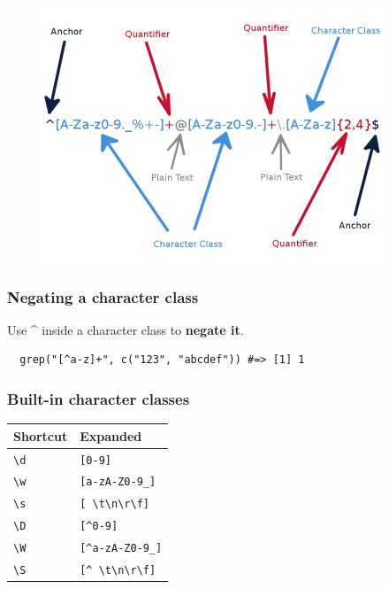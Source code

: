 \documentclass{beamer}
\begin{document}
\begin{frame}
  \begin{figure}[h]
    \centering
    \includegraphics[width=4in]{"email-regexp-2"}
  \end{figure}
\end{frame}
\begin{frame}[fragile]
  \frametitle{Negating a character class}
  Use \^{} inside a character class to \textbf{negate it}.
  \vspace{3mm}

\begin{verbatim}
  grep("[^a-z]+", c("123", "abcdef")) #=> [1] 1
\end{verbatim}
\end{frame}
\begin{frame}
  \frametitle{Built-in character classes}
  \begin{tabular}{|l|l|}
    \hline \textbf{Shortcut} & \textbf{Expanded} \\
    \hline \texttt{\textbackslash d} & \texttt{[0-9]} \\
    \hline \texttt{\textbackslash w} & \texttt{[a-zA-Z0-9\_]} \\
    \hline \texttt{\textbackslash s} & \texttt{[ \textbackslash t\textbackslash n\textbackslash r\textbackslash f]} \\
    \hline \texttt{\textbackslash D} & \texttt{[\textasciicircum 0-9]} \\
    \hline \texttt{\textbackslash W} & \texttt{[\textasciicircum a-zA-Z0-9\_]} \\
    \hline \texttt{\textbackslash S} & \texttt{[\textasciicircum \ \textbackslash t\textbackslash n\textbackslash r\textbackslash f]} \\
    \hline
  \end{tabular}
\end{frame}
\end{document}
